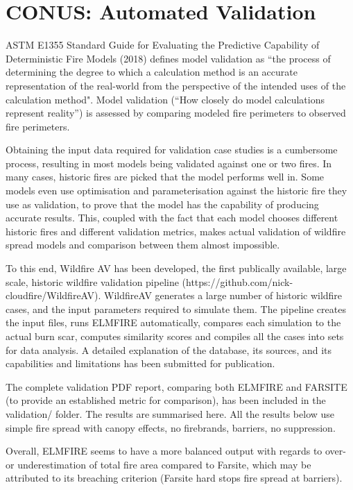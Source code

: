 \section{CONUS: Automated Validation}

ASTM E1355 Standard Guide for Evaluating the Predictive Capability of Deterministic Fire Models (2018) defines model validation as “the process of determining the degree to which a calculation method is an accurate representation of the real-world from the perspective of the intended uses of the calculation method". Model validation (“How closely do model calculations represent reality”) is assessed by comparing modeled fire perimeters to observed fire perimeters.

Obtaining the input data required for validation case studies is a cumbersome process, resulting in most models being validated against one or two fires. In many cases, historic fires are picked that the model performs well in. Some models even use optimisation and parameterisation against the historic fire they use as validation, to prove that the model has the capability of producing accurate results. This, coupled with the fact that each model chooses different historic fires and different validation metrics, makes actual validation of wildfire spread models and comparison between them almost impossible. 

To this end, Wildfire AV has been developed, the first publically available, large scale, historic wildfire validation pipeline (https://github.com/nick-cloudfire/WildfireAV). WildfireAV generates a large number of historic wildfire cases, and the input parameters required to simulate them. The pipeline creates the input files, runs ELMFIRE automatically, compares each simulation to the actual burn scar, computes similarity scores and compiles all the cases into sets for data analysis. A detailed explanation of the database, its sources, and its capabilities and limitations has been submitted for publication. 

The complete validation PDF report, comparing both ELMFIRE and FARSITE (to provide an established metric for comparison), has been included in the validation/ folder. The results are summarised here. All the results below use simple fire spread with canopy effects, no firebrands, barriers, no suppression. 

Overall, ELMFIRE seems to have a more balanced output with regards to over- or underestimation of total fire area compared to Farsite, which may be attributed to its breaching criterion (Farsite hard stops fire spread at barriers). 

